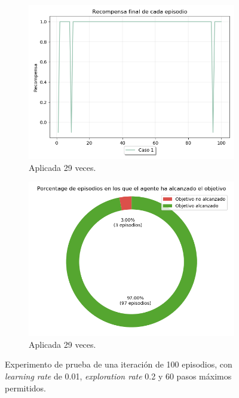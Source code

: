\begin{figure}
\begin{subfigure}{.6\textwidth}
        \centering
        \includegraphics[scale=0.35]{cap5_experimentacion/images/initial_recompensa.png}
        \caption{Aplicada 29 veces.}
        \label{fig:initial_recompensa}
    \end{subfigure}%
    \begin{subfigure}{.6\textwidth}
        \centering
        \includegraphics[scale=0.35]{cap5_experimentacion/images/initial_porcentajeResuelto.png}
        \caption{Aplicada 29 veces.}
        \label{fig:initial_porcentajeResuelto}
    \end{subfigure}
    \caption{Experimento de prueba de una iteración de 100 episodios, con \textit{learning rate} de 0.01, \textit{exploration rate} 0.2 y 60 pasos máximos permitidos.}
    \label{fig:initial}
\end{figure}

